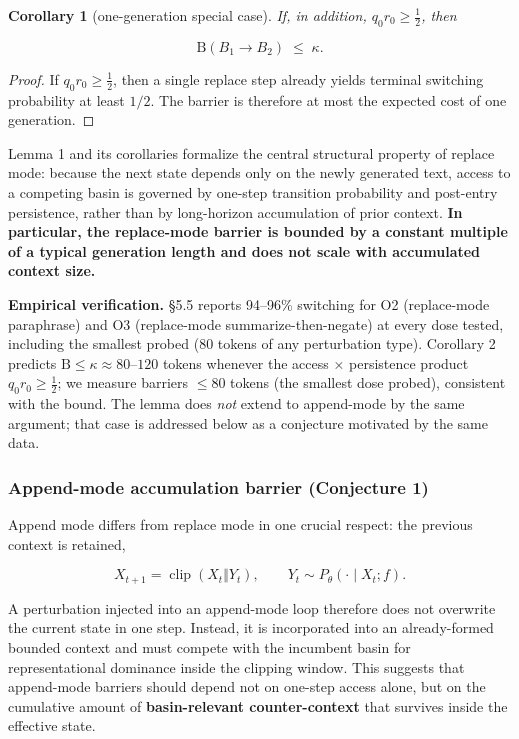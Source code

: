 \documentclass{article}
\theoremstyle{plain}
\newtheorem{corollary}{Corollary}
\theoremstyle{definition}
\begin{document}
\begin{corollary}[one-generation special case]
 If, in addition,
$q_0 r_0 \ge \tfrac{1}{2}$, then

\begin{equation*}
\mathrm{B}(B_1 \to B_2) \;\le\; \kappa.
\end{equation*}
\end{corollary}

\begin{proof}
 If $q_0 r_0 \ge \tfrac{1}{2}$, then a single replace step
already yields terminal switching probability at least $1/2$. The
barrier is therefore at most the expected cost of one generation.
\end{proof}


Lemma 1 and its corollaries formalize the central structural property
of replace mode: because the next state depends only on the newly
generated text, access to a competing basin is governed by one-step
transition probability and post-entry persistence, rather than by
long-horizon accumulation of prior context. \textbf{In particular, the
replace-mode barrier is bounded by a constant multiple of a typical
generation length and does not scale with accumulated context size.}

\textbf{Empirical verification.} §5.5 reports 94–96\% switching for O2
(replace-mode paraphrase) and O3 (replace-mode summarize-then-negate)
at every dose tested, including the smallest probed (80 tokens of
any perturbation type). Corollary 2 predicts $\mathrm{B} \le \kappa
\approx 80$–$120$ tokens whenever the access × persistence product
$q_0 r_0 \ge \tfrac{1}{2}$; we measure barriers $\le 80$ tokens (the
smallest dose probed), consistent with the bound. The lemma does
\textit{not} extend to append-mode by the same argument; that case is
addressed below as a conjecture motivated by the same data.

\subsubsection{Append-mode accumulation barrier (Conjecture 1)}

Append mode differs from replace mode in one crucial respect: the
previous context is retained,

\begin{equation*}
X_{t+1} = \operatorname{clip}(X_t \Vert Y_t),
\qquad Y_t \sim P_\theta(\cdot \mid X_t; f).
\end{equation*}

A perturbation injected into an append-mode loop therefore does not
overwrite the current state in one step. Instead, it is incorporated
into an already-formed bounded context and must compete with the
incumbent basin for representational dominance inside the clipping
window. This suggests that append-mode barriers should depend not on
one-step access alone, but on the cumulative amount of
\textbf{basin-relevant counter-context} that survives inside the effective
state.
\end{document}
